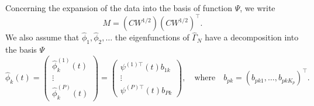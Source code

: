 Concerning the expansion of the data into the basis of function $\Psi$, we write 
\begin{equation}
    M = \left(CW^{1/2}\right)\left(CW^{1/2}\right)^\top.
\end{equation}
We also assume that $\widehat{\phi}_1, \widehat{\phi}_2, \dots$ the eigenfunctions of $\widehat{\Gamma}_N$ have a decomposition into the basis $\Psi$
\begin{equation}
    \widehat{\phi}_k(t) = 
        \begin{pmatrix} 
            \widehat{\phi}_k^{(1)}(t) \\
            \vdots \\
            \widehat{\phi}_k^{(P)}(t)
        \end{pmatrix} = 
        \begin{pmatrix} 
            \psi^{(1) \top}(t) b_{1k} \\
            \vdots \\
            \psi^{(P) \top}(t) b_{Pk}
        \end{pmatrix}, \quad\text{where}\quad
        b_{pk} = \left(b_{p k 1}, \dots, b_{p k K_p} \right)^\top.
\end{equation}

